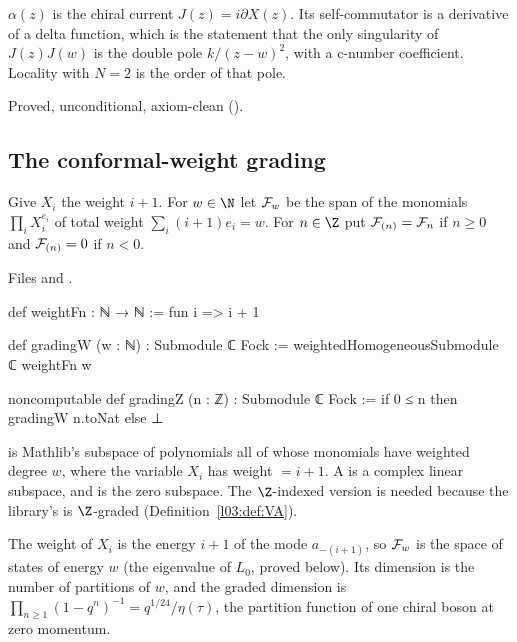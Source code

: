 \begin{physics}
$\alpha(z)$ is the chiral current $J(z)=i\partial X(z)$. Its self-commutator is a derivative of a delta
function, which is the statement that the only singularity of $J(z)J(w)$ is the double pole
$k/(z-w)^2$, with a c-number coefficient. Locality with $N=2$ is the order of that pole.
\end{physics}

\begin{status}
Proved, unconditional, axiom-clean ().
\end{status}

\subsection{The conformal-weight grading}

\begin{definition}\label{l05:def:gradingW}
Give $X_i$ the weight $i+1$. For $w\in\N$ let $\mathcal{F}_w$ be the span of the monomials
$\prod_iX_i^{e_i}$ of total weight $\sum_i(i+1)e_i=w$. For $n\in\Z$ put $\mathcal{F}_{(n)}=\mathcal{F}_n$ if $n\ge0$ and
$\mathcal{F}_{(n)}=0$ if $n<0$.
\end{definition}

\noindent Files  and
.
\begin{leancode}
def weightFn : ℕ → ℕ := fun i => i + 1

def gradingW (w : ℕ) : Submodule ℂ Fock :=
  weightedHomogeneousSubmodule ℂ weightFn w

noncomputable def gradingZ (n : ℤ) : Submodule ℂ Fock :=
  if 0 ≤ n then gradingW n.toNat else ⊥
\end{leancode}

\begin{dictionary}
 is Mathlib's subspace of polynomials all of whose
monomials have weighted degree $w$, where the variable $X_i$ has weight  $=i+1$. A
 is a complex linear subspace, and  is the zero subspace. The $\Z$-indexed
version is needed because the library's  is $\Z$-graded
(Definition~\ref{l03:def:VA}).
\end{dictionary}

\begin{physics}
The weight of $X_i$ is the energy $i+1$ of the mode $a_{-(i+1)}$, so $\mathcal{F}_w$ is the space of states of
energy $w$ (the eigenvalue of $L_0$, proved below). Its dimension is the number of partitions of $w$, and the
graded dimension is $\prod_{n\ge1}(1-q^n)^{-1}=q^{1/24}/\eta(\tau)$, the partition function of one chiral boson
at zero momentum.
\end{physics}


